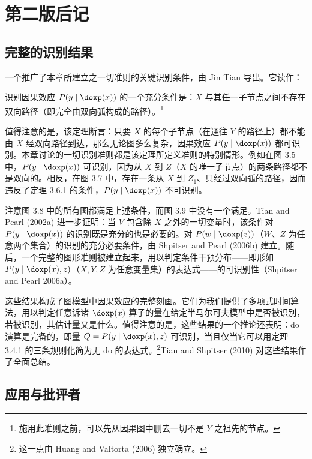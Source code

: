\section*{第二版后记}

\subsection*{完整的识别结果}

一个推广了本章所建立之一切准则的关键识别条件，由 Jin Tian 导出。它读作：

\begin{theorem}
识别因果效应 $P(y\mid\doxp(x))$ 的一个充分条件是：$X$ 与其任一子节点之间不存在双向路径（即完全由双向弧构成的路径）。\footnote{施用此准则之前，可以先从因果图中删去一切不是 $Y$ 之祖先的节点。}
\end{theorem}

值得注意的是，该定理断言：只要 $X$ 的每个子节点（在通往 $Y$ 的路径上）都不能由 $X$ 经双向路径到达，那么无论图多么复杂，因果效应 $P(y\mid\doxp(x))$ 都可识别。本章讨论的一切识别准则都是该定理所定义准则的特别情形。例如在图 3.5 中，$P(y\mid\doxp(x))$ 可识别，因为从 $X$ 到 $Z$（$X$ 的唯一子节点）的两条路径都不是双向的。相反，在图 3.7 中，存在一条从 $X$ 到 $Z_1$、只经过双向弧的路径，因而违反了定理 3.6.1 的条件，$P(y\mid\doxp(x))$ 不可识别。

注意图 3.8 中的所有图都满足上述条件，而图 3.9 中没有一个满足。Tian and Pearl (2002a) 进一步证明：当 $V$ 包含除 $X$ 之外的一切变量时，该条件对 $P(y\mid\doxp(x))$ 的识别既是充分的也是必要的。对 $P(w\mid\doxp(z))$（$W$、$Z$ 为任意两个集合）的识别的充分必要条件，由 Shpitser and Pearl (2006b) 建立。随后，一个完整的图形准则被建立起来，用以判定条件干预分布——即形如 $P(y\mid\doxp(x),z)$（$X,Y,Z$ 为任意变量集）的表达式——的可识别性（Shpitser and Pearl 2006a）。

这些结果构成了图模型中因果效应的完整刻画。它们为我们提供了多项式时间算法，用以判定任意诉诸 $\doxp(x)$ 算子的量在给定半马尔可夫模型中是否被识别，若被识别，其估计量又是什么。值得注意的是，这些结果的一个推论还表明：do 演算是完备的，即量 $Q=P(y\mid\doxp(x),z)$ 可识别，当且仅当它可以用定理 3.4.1 的三条规则化简为无 do 的表达式。\footnote{这一点由 Huang and Valtorta (2006) 独立确立。}Tian and Shpitser (2010) 对这些结果作了全面总结。

\subsection*{应用与批评者}

